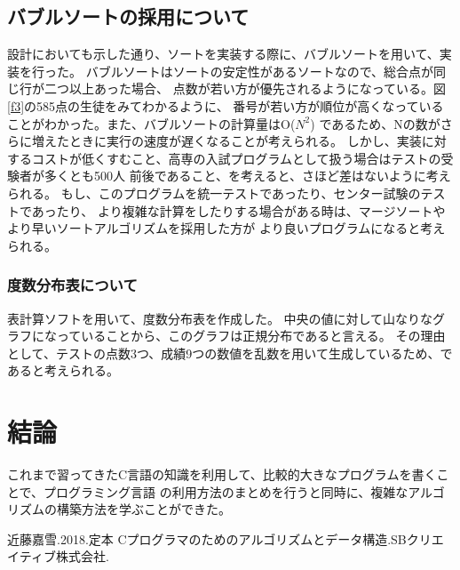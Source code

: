 \documentclass{jsarticle}
\begin{document}
\subsection{バブルソートの採用について}
設計においても示した通り、ソートを実装する際に、バブルソートを用いて、実装を行った。
バブルソートはソートの安定性があるソートなので、総合点が同じ行が二つ以上あった場合、
点数が若い方が優先されるようになっている。図\ref{f3}の585点の生徒をみてわかるように、
番号が若い方が順位が高くなっていることがわかった。また、バブルソートの計算量はO($N^2$)
であるため、Nの数がさらに増えたときに実行の速度が遅くなることが考えられる。
しかし、実装に対するコストが低くすむこと、高専の入試プログラムとして扱う場合はテストの受験者が多くとも500人
前後であること、を考えると、さほど差はないように考えられる。
もし、このプログラムを統一テストであったり、センター試験のテストであったり、
より複雑な計算をしたりする場合がある時は、マージソートやより早いソートアルゴリズムを採用した方が
より良いプログラムになると考えられる。

\subsubsection{度数分布表について}
表計算ソフトを用いて、度数分布表を作成した。
中央の値に対して山なりなグラフになっていることから、このグラフは正規分布であると言える。
その理由として、テストの点数3つ、成績9つの数値を乱数を用いて生成しているため、であると考えられる。
\newpage
\section{結論}
これまで習ってきたC言語の知識を利用して、比較的大きなプログラムを書くことで、プログラミング言語
の利用方法のまとめを行うと同時に、複雑なアルゴリズムの構築方法を学ぶことができた。

\begin{thebibliography}{99}

       近藤嘉雪.2018.定本 Cプログラマのためのアルゴリズムとデータ構造.SBクリエイティブ株式会社.
  \end{thebibliography}
\end{document}
